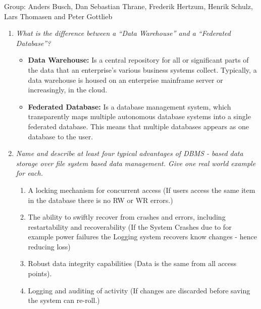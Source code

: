 \documentclass[a4paper,10pt,titlepage]{article}
\begin{document}
Group: Anders Busch, Dan Sebastian Thrane, Frederik Hertzum, Henrik Schulz, Lars Thomasen and Peter Gottlieb
\begin{enumerate}
\item
\textit{What is the difference between a “Data Warehouse” and a “Federated Database”?}\\

\begin{itemize}
\item
\textbf{Data Warehouse:} Is a central repository for all or significant parts of the data that an enterprise's various business systems collect. Typically, a data warehouse is housed on an enterprise mainframe server or increasingly, in the cloud. 
\item
\textbf{Federated Database:} Is a database management system, which transparently maps multiple autonomous database systems into a single federated database. This means that multiple databases appears as one database to the user.
\end{itemize}

\item
\textit{Name and describe at least four typical advantages of DBMS - based data storage over file system based data management. Give one real world example for each.}\\

\begin{enumerate}
\item
A locking mechanism for concurrent access (If users access the same item in the database there is no RW or WR errors.)
\item
The ability to swiftly recover from crashes and errors, including restartability and recoverability (If the System Crashes due to for example power failures the Logging system recovers know changes - hence reducing loss)
\item
Robust data integrity capabilities (Data is the same from all access points).
\item
Logging and auditing of activity (If changes are discarded before saving the system can re-roll.)
\end{enumerate}


\end{enumerate}
\end{document}
